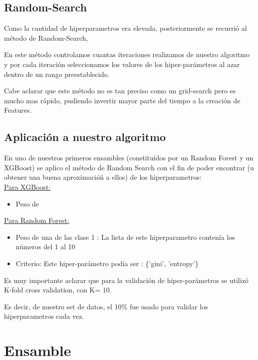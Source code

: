 \documentclass[a4paper ,12pt]{article}
\begin{document}
\subsection{Random-Search}

Como la cantidad de hiperparametros era elevada, posteriormente se recurrió al método de Random-Search,

En este método controlamos cuantas iteraciones realizamos de nuestro algoritmo y por cada iteración seleccionamos los valores de los
hiper-parámetros al azar dentro de un rango preestablecido. 

Cabe aclarar que este método no es tan preciso como un grid-search pero es mucho mas rápido, pudiendo invertir mayor parte del tiempo a la creación de Features.

\subsection{Aplicación a nuestro algoritmo}

En uno de nuestros primeros ensambles (constituídos por un Random Forest y un XGBoost) se aplico el método de Random Search con el fin de poder encontrar (u obtener una buena aproximacióń a ellos) de los hiperparametros:\\

\underline{Para XGBoost: }

\begin{itemize}
	\item Peso de
\end{itemize}



\underline{Para Random Forest:}

\begin{itemize}
	
	\item Peso de una de las clase 1 : La lista de este hiperparametro contenía los números del 1 al 10
	
	\item Criterio: Este hiper-parámetro podía ser : \{'gini', 'entropy'\}

\end{itemize}


Es muy importante aclarar que para la validación de hiper-parámetros se utilizó K-fold cross validation, con K= 10.

Es decir, de nuestro set de datos, el 10\% fue usado para validar los hiperparametros cada vez.


\newpage
\section{Ensamble}
\end{document}
